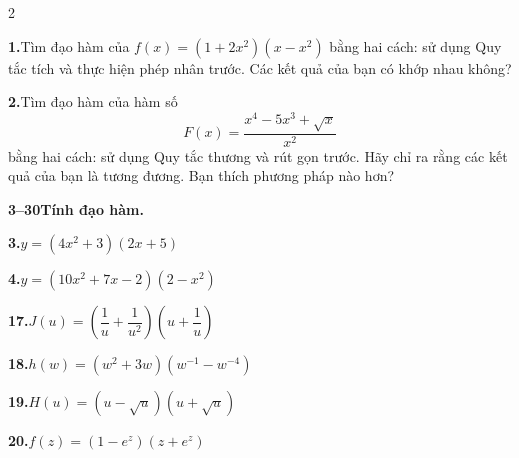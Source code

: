 \begin{multicols}{2}
\setlength{\columnsep}{22pt}

\noindent
\textbf{1.}\enspace Tìm đạo hàm của $f(x) = (1 + 2x^2)(x - x^2)$ bằng hai cách: sử dụng Quy tắc tích và thực hiện phép nhân trước. Các kết quả của bạn có khớp nhau không?

\vspace{5pt}
\noindent
\textbf{2.}\enspace Tìm đạo hàm của hàm số
\[
F(x) = \frac{x^4 - 5x^3 + \sqrt{x}}{x^2}
\]
bằng hai cách: sử dụng Quy tắc thương và rút gọn trước. Hãy chỉ ra rằng các kết quả của bạn là tương đương. Bạn thích phương pháp nào hơn?

\vspace{6pt}
\noindent
{\color{stewartcyan}\textbf{\textsf{3–30}}}\quad \textbf{Tính đạo hàm.}

\vspace{5pt}
\noindent
\textbf{3.}\enspace $y = (4x^2 + 3)(2x + 5)$ \par\vspace{5.5pt}

\noindent
\textbf{4.}\enspace $y = (10x^2 + 7x - 2)(2 - x^2)$ \par\vspace{5.5pt}


\noindent
\textbf{17.}\enspace $J(u) = \left(\dfrac{1}{u} + \dfrac{1}{u^2}\right)\left(u + \dfrac{1}{u}\right)$ \par\vspace{5.5pt}

\noindent
\textbf{18.}\enspace $h(w) = (w^2 + 3w)(w^{-1} - w^{-4})$ \par\vspace{5.5pt}

\noindent
\textbf{19.}\enspace $H(u) = (u - \sqrt{u})(u + \sqrt{u})$

\columnbreak

\noindent
\textbf{20.}\enspace $f(z) = (1 - e^z)(z + e^z)$ \par\vspace{5.5pt}


\end{multicols}
